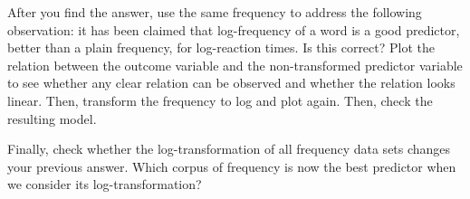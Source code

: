 \documentclass[
]{article}
\newenvironment{Shaded}{\begin{snugshade}}{\end{snugshade}}
\newcommand{\AttributeTok}[1]{\textcolor[rgb]{0.13,0.29,0.53}{#1}}
\newcommand{\CommentTok}[1]{\textcolor[rgb]{0.56,0.35,0.01}{\textit{#1}}}
\newcommand{\FunctionTok}[1]{\textcolor[rgb]{0.13,0.29,0.53}{\textbf{#1}}}
\newcommand{\NormalTok}[1]{#1}
\newcommand{\OtherTok}[1]{\textcolor[rgb]{0.56,0.35,0.01}{#1}}
\newcommand{\SpecialCharTok}[1]{\textcolor[rgb]{0.81,0.36,0.00}{\textbf{#1}}}
\newcommand{\StringTok}[1]{\textcolor[rgb]{0.31,0.60,0.02}{#1}}
\begin{document}
After you find the answer, use the same frequency to address the
following observation: it has been claimed that log-frequency of a word
is a good predictor, better than a plain frequency, for log-reaction
times. Is this correct? Plot the relation between the outcome variable
and the non-transformed predictor variable to see whether any clear
relation can be observed and whether the relation looks linear. Then,
transform the frequency to log and plot again. Then, check the resulting
model.

Finally, check whether the log-transformation of all frequency data sets
changes your previous answer. Which corpus of frequency is now the best
predictor when we consider its log-transformation?

\begin{Shaded}
\end{Shaded}
\end{document}
